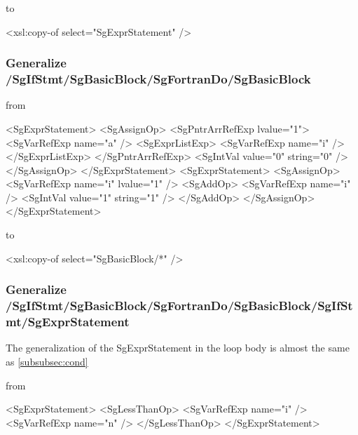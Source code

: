 to

\begin{framed}
\begin{src}
		<xsl:copy-of select="SgExprStatement" />
\end{src}
\end{framed}

\subsubsection{Generalize /SgIfStmt/SgBasicBlock/SgFortranDo/SgBasicBlock}


from

\begin{framed}
\begin{src}
				<SgExprStatement>
					<SgAssignOp>
						<SgPntrArrRefExp lvalue="1">
							<SgVarRefExp name="a" />
							<SgExprListExp>
								<SgVarRefExp name="i" />
							</SgExprListExp>
						</SgPntrArrRefExp>
						<SgIntVal value="0" string="0" />
					</SgAssignOp>
				</SgExprStatement>
				<SgExprStatement>
					<SgAssignOp>
						<SgVarRefExp name="i" lvalue="1" />
						<SgAddOp>
							<SgVarRefExp name="i" />
							<SgIntVal value="1" string="1" />
						</SgAddOp>
					</SgAssignOp>
				</SgExprStatement>
\end{src}
\end{framed}

to

\begin{framed}
\begin{src}
					<xsl:copy-of select="SgBasicBlock/*" />
\end{src}
\end{framed}

\subsubsection{Generalize /SgIfStmt/SgBasicBlock/SgFortranDo/SgBasicBlock/SgIfStmt/SgExprStatement}

The generalization of the SgExprStatement in the loop body is almost the same as \ref{subsubsec:cond}

from

\begin{framed}
\begin{src}
					<SgExprStatement>
						<SgLessThanOp>
							<SgVarRefExp name="i" />
							<SgVarRefExp name="n" />
						</SgLessThanOp>
					</SgExprStatement>
\end{src}
\end{framed}

